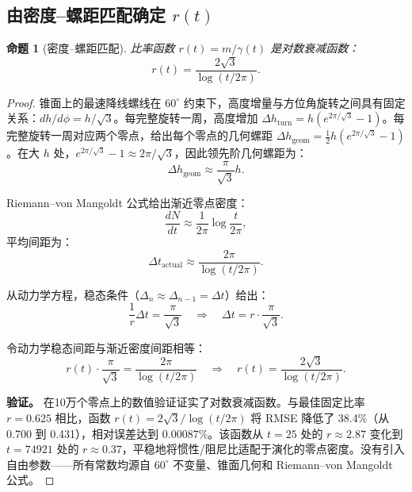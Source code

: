 \documentclass[12pt,a4paper]{article}
\newtheorem{proposition}[theorem]{命题}
\begin{document}
\subsection{由密度--螺距匹配确定 $r(t)$}
\label{sec:density-pitch}

\begin{proposition}[密度--螺距匹配]
\label{prop:r-function}
比率函数 $r(t) = m/\gamma(t)$ 是对数衰减函数：
\begin{equation}
r(t) = \frac{2\sqrt{3}}{\log(t/2\pi)}.
\end{equation}
\end{proposition}

\begin{proof}
锥面上的最速降线螺线在 $60^\circ$ 约束下，高度增量与方位角旋转之间具有固定关系：$dh/d\phi = h/\sqrt{3}$。每完整旋转一周，高度增加 $\Delta h_{\text{turn}} = h(e^{2\pi/\sqrt{3}}-1)$。每完整旋转一周对应两个零点，给出每个零点的几何螺距 $\Delta h_{\text{geom}} = \frac{1}{2}h(e^{2\pi/\sqrt{3}}-1)$。在大 $h$ 处，$e^{2\pi/\sqrt{3}}-1 \approx 2\pi/\sqrt{3}$，因此领先阶几何螺距为：
\begin{equation}
\Delta h_{\text{geom}} \approx \frac{\pi}{\sqrt{3}} h.
\end{equation}

Riemann--von Mangoldt 公式给出渐近零点密度：
\begin{equation}
\frac{dN}{dt} \approx \frac{1}{2\pi}\log\frac{t}{2\pi},
\end{equation}
平均间距为：
\begin{equation}
\Delta t_{\text{actual}} \approx \frac{2\pi}{\log(t/2\pi)}.
\end{equation}

从动力学方程，稳态条件（$\Delta_n \approx \Delta_{n-1} = \Delta t$）给出：
\begin{equation}
\frac{1}{r}\Delta t = \frac{\pi}{\sqrt{3}} \quad \Longrightarrow \quad \Delta t = r \cdot \frac{\pi}{\sqrt{3}}.
\end{equation}

令动力学稳态间距与渐近密度间距相等：
\begin{equation}
r(t) \cdot \frac{\pi}{\sqrt{3}} = \frac{2\pi}{\log(t/2\pi)} \quad \Longrightarrow \quad r(t) = \frac{2\sqrt{3}}{\log(t/2\pi)}.
\end{equation}

\textbf{验证。} 在10万个零点上的数值验证证实了对数衰减函数。与最佳固定比率 $r=0.625$ 相比，函数 $r(t) = 2\sqrt{3}/\log(t/2\pi)$ 将 RMSE 降低了 38.4\%（从 0.700 到 0.431），相对误差达到 $0.00087\%$。该函数从 $t=25$ 处的 $r \approx 2.87$ 变化到 $t=74921$ 处的 $r \approx 0.37$，平稳地将惯性/阻尼比适配于演化的零点密度。没有引入自由参数——所有常数均源自 $60^\circ$ 不变量、锥面几何和 Riemann--von Mangoldt 公式。
\end{proof}
\end{document}
